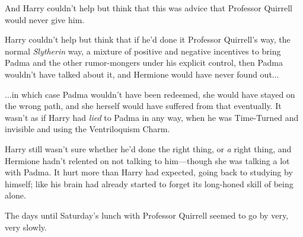 And Harry couldn’t help but think that this was advice that Professor Quirrell would never give him.

Harry couldn’t help but think that if he’d done it Professor Quirrell’s way, the normal \emph{Slytherin} way, a mixture of positive and negative incentives to bring Padma and the other rumor-mongers under his explicit control, then Padma wouldn’t have talked about it, and Hermione would have never found out...

...in which case Padma wouldn’t have been redeemed, she would have stayed on the wrong path, and she herself would have suffered from that eventually. It wasn’t as if Harry had \emph{lied} to Padma in any way, when he was Time-Turned and invisible and using the Ventriloquism Charm.

Harry still wasn’t sure whether he’d done the right thing, or \emph{a} right thing, and Hermione hadn’t relented on not talking to him—though she was talking a lot with Padma. It hurt more than Harry had expected, going back to studying by himself; like his brain had already started to forget its long-honed skill of being alone.

The days until Saturday’s lunch with Professor Quirrell seemed to go by very, very slowly.

